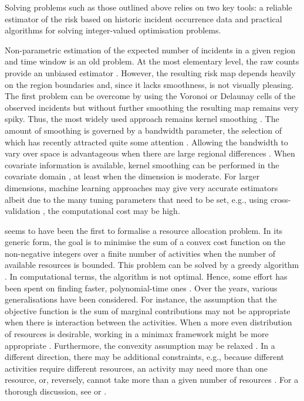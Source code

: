 \documentclass[twoside,11pt]{article}
\begin{document}
Solving problems such as those outlined above relies on two key tools: 
a reliable estimator of the risk based on historic incident occurrence
data and practical algorithms for solving integer-valued optimisation 
problems.

Non-parametric estimation of the expected number of incidents
in a given region and time window is an old problem. At the most elementary
level, the raw counts provide an unbiased estimator \citep{DuRi29}. 
However, the resulting risk map depends heavily on the region 
boundaries and, since it lacks smoothness, is not visually pleasing.
The first problem can be overcome by using the Voronoi or Delaunay 
cells of the observed incidents 
\citep{BarrScho10,Lies12,Moraetal19,Ord78,SchaWeyg00} but without 
further smoothing the resulting map remains very spiky. Thus, 
the most widely used approach remains kernel smoothing \citep{Digg85}. 
The amount of smoothing is governed by a bandwidth parameter, the 
selection of which has recently attracted quite some attention 
\citep{CronLies18,Lies20,Lo17}. Allowing the bandwidth to vary over 
space is advantageous when there are large regional differences 
\citep{Abra82,Davietal18,Lies21}. When covariate information is
available, kernel smoothing can be performed in the covariate domain
\citep{Gua08}, at least when the dimension is moderate. For larger
dimensions, machine learning approaches may give very accurate
estimators \citep{BiscLava25,Kimetal22,Luetal25} albeit due to 
the many tuning parameters that need to be set, e.g., using 
cross-validation \citep{Cronetal23}, the computational cost may be high.

\citet{Koop53} seems to have been the first to formalise a resource
allocation problem. In its generic form, the goal is to minimise the 
sum of a convex cost function on the non-negative integers over a finite
number of activities when the number of available resources is bounded.
This problem can be solved by a greedy algorithm \citep{Gros56}. 
In computational terms, the algorithm is not optimal. Hence, 
some effort has been spent on finding faster, polynomial-time
ones \citep{FredJohn82,Grotetal93}. Over the years, various 
generalisations have been considered. For instance, the assumption 
that the objective function is the sum of marginal contributions may 
not be appropriate when there is interaction between the activities. 
When a more even distribution of resources is desirable, working in 
a minimax framework might be more appropriate \citep{KleiLuss91,Luss92}. 
Furthermore, the convexity assumption may be relaxed \citep{Muro98}. 
In a different direction, there may be additional constraints, e.g., 
because different activities require different resources, an activity 
may need more than one resource, or, reversely, cannot take more than
a given number of resources \citep{Fuji05}. For a thorough discussion, 
see \citet{Katoetal25} or \citet{Schr03}.
\end{document}
